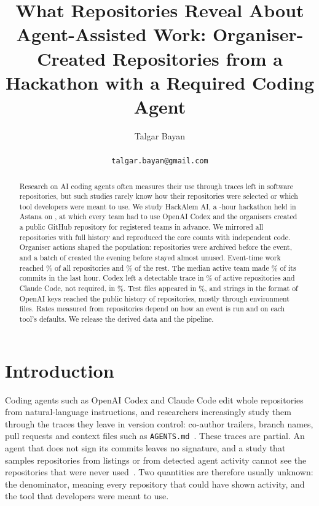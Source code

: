 \documentclass{article}
\title{What Repositories Reveal About Agent-Assisted Work: \NRqOneTotal{} Organiser-Created Repositories from a Hackathon with a Required Coding Agent}
\date{\versiondate}
\author{
  Talgar Bayan \\
  \pending{affiliation} \\
  \texttt{talgar.bayan@gmail.com}
}
\begin{document}
\maketitle

\begin{abstract}
Research on AI coding agents often measures their use through traces left in software repositories, but such studies rarely know how their repositories were selected or which tool developers were meant to use. We study HackAlem AI, a \eventhours-hour hackathon held in Astana on \eventdate, at which every team had to use OpenAI Codex and the organisers created a public GitHub repository for registered teams in advance. We mirrored all \NRqOneTotal{} repositories with full history and reproduced the core counts with independent code. Organiser actions shaped the population: \NRqOnePrearchivedN{} repositories were archived before the event, and a batch of \NRqOneBatchN{} created the evening before stayed almost unused. Event-time work reached \NRqOneActivePct\% of all repositories and \NRqOneActiveOfOpenNonbatchPct\% of the rest. The median active team made \NRqTwoTeamShareMedian\% of its commits in the last hour. Codex left a detectable trace in \NRqTwoTracesCodexAnyPct\% of active repositories and Claude Code, not required, in \NRqTwoTracesClaudeAnyPct\%. Test files appeared in \NRqThreeTestsPct\%, and strings in the format of OpenAI keys reached the public history of \NRqFourOpenaiN{} repositories, mostly through environment files. Rates measured from repositories depend on how an event is run and on each tool's defaults. We release the derived data and the pipeline.
\end{abstract}

\section{Introduction}\label{sec:intro}

Coding agents such as OpenAI Codex and Claude Code edit whole repositories from natural-language instructions, and researchers increasingly study them through the traces they leave in version control: co-author trailers, branch names, pull requests and context files such as \texttt{AGENTS.md}~\cite{li2025aidev,robbes2026agenticmuch,robbes2026heuristics,chatlatanagulchai2025agentreadmes}. These traces are partial. An agent that does not sign its commits leaves no signature, and a study that samples repositories from listings or from detected agent activity cannot see the repositories that were never used~\cite{robbes2026heuristics,kalliamvakou2014perils,baltes2022sampling}. Two quantities are therefore usually unknown: the denominator, meaning every repository that could have shown activity, and the tool that developers were meant to use.
\end{document}

